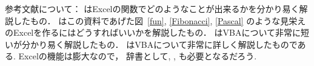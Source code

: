 参考文献について：
\cite{Y}はExcelの関数でどのようなことが出来るかを分かり易く解説したもの．
\cite{Kum}はこの資料であげた図~\ref{fun}, \ref{Fibonacci}, \ref{Pascal} のような見栄えのExcelを作るにはどうすればいいかを解説したもの．
\cite{Kud}はVBAについて非常に短いが分かり易く解説したもの．
\cite{T}はVBAについて非常に詳しく解説したものである.
Excelの機能は膨大なので，
辞書として\cite{EV}, \cite{EL}, \cite{EF} も必要となるだろう.
\clearpage

%

